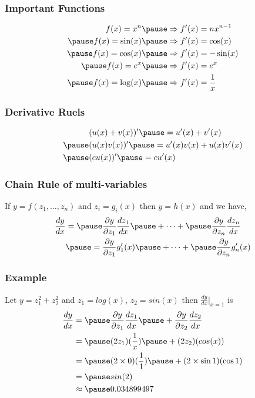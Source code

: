 \documentclass[12pt,aspectratio=169]{beamer}
\newcommand{\at}[2][]{#1|_{#2}}
\begin{document}
\begin{frame}
\frametitle{Important Functions}
\[
\begin{aligned}
f(x)=x^n & \pause\Rightarrow f'(x)=nx^{n-1}\\  \pause
f(x)=\sin (x) &\pause\Rightarrow f'(x)=\cos (x)\\ \pause
f(x)=\cos (x) &\pause\Rightarrow f'(x)=-\sin (x)\\ \pause
f(x)=e^x &\pause\Rightarrow f'(x)=e^x\\ \pause
f(x)=\log (x) &\pause\Rightarrow f'(x)=\frac{1}{x}
\end{aligned}
\]
\end{frame}

\begin{frame}
\frametitle{Derivative Ruels}
\[
\begin{aligned}
&(u(x)+v(x))'\pause =u'(x)+v'(x)\\ \pause
&(u(x)v(x))'\pause =u'(x)v(x)+u(x)v'(x)\\ \pause
&(cu(x))'\pause =cu'(x) 
\end{aligned}
\]
\end{frame}

\begin{frame}
\frametitle{Chain Rule of multi-variables}
If $y=f(z_1,\dots,z_n)$ and $z_i=g_i(x)$ then $y=h(x)$ and we have,\pause
\[
\begin{aligned}
\frac{dy}{dx}&=\pause\frac{\partial y}{\partial z_1}\frac{dz_1}{dx}\pause+\dots+\pause\frac{\partial y}{\partial z_n}\frac{dz_n}{dx}\\ 
& \pause=\frac{\partial y}{\partial z_1}g_1'(x)\pause+\dots+\pause \frac{\partial y}{\partial z_n}g_n'(x)
\end{aligned}
\]
\end{frame}

\begin{frame}
\frametitle{Example}
Let $y=z_1^2+z_2^2$ and $z_1=log(x)$, $z_2=sin(x)$ then $\frac{dy}{dx}\at[\big]{x=1}$ is\pause
\[
\begin{aligned}
\frac{dy}{dx}&=\pause\frac{\partial y}{\partial z_1}\frac{dz_1}{dx}\pause+\frac{\partial y}{\partial z_2}\frac{dz_2}{dx}\\
&=\pause (2z_1)(\frac{1}{x})\pause+(2z_2)(cos(x))\\
&=\pause(2\times 0)(\frac{1}{1})\pause+(2\times \sin 1)(\cos 1)\\
&=\pause sin(2)\\
&\approx \pause 0.034899497
\end{aligned}
\]
\end{frame}
\end{document}
